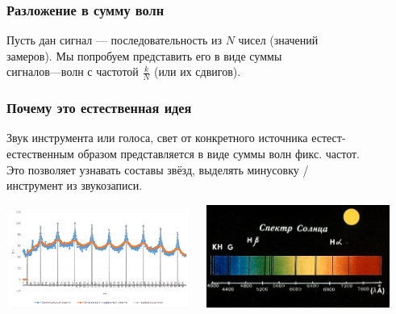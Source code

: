 \documentclass[11pt,aspectratio=169,svgnames]{beamer}
\begin{document}
\begin{frame} \frametitle{Разложение в сумму волн}
	Пусть дан сигнал — последовательность из \(N\) чисел (значений \\
	замеров). Мы попробуем представить его в виде суммы \\
	сигналов—волн с частотой \(\frac{k}{N}\) (или их сдвигов). \medskip

  \begin{center}  \end{center}
\end{frame}

\begin{frame} \frametitle{Почему это естественная идея}
  Звук инструмента или голоса, свет от конкретного источника естест-\\
  естественным образом представляется в виде суммы волн фикс. частот. \\
  Это позволяет узнавать составы звёзд, выделять минусовку / \\
  инструмент из звукозаписи.

\begin{center}
\includegraphics[width=0.45\textwidth]{img/spectre-guitar}\ \ \ 
\includegraphics[width=0.45\textwidth]{img/spectre-sun}
\end{center}
\end{frame}
\end{document}
